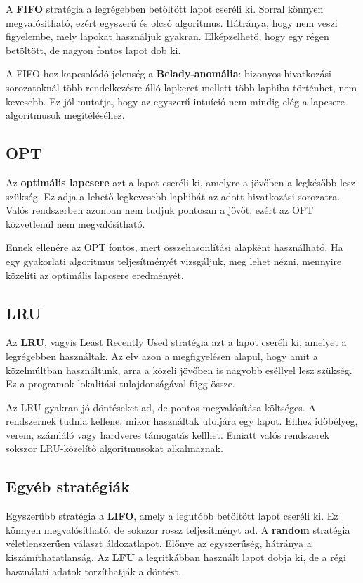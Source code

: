 A \textbf{FIFO} stratégia a legrégebben betöltött lapot cseréli ki. Sorral könnyen megvalósítható, ezért egyszerű és olcsó algoritmus. Hátránya, hogy nem veszi figyelembe, mely lapokat használjuk gyakran. Elképzelhető, hogy egy régen betöltött, de nagyon fontos lapot dob ki.

A FIFO-hoz kapcsolódó jelenség a \textbf{Belady-anomália}: bizonyos hivatkozási sorozatoknál több rendelkezésre álló lapkeret mellett több laphiba történhet, nem kevesebb. Ez jól mutatja, hogy az egyszerű intuíció nem mindig elég a lapcsere algoritmusok megítéléséhez.

\subsection{OPT}

Az \textbf{optimális lapcsere} azt a lapot cseréli ki, amelyre a jövőben a legkésőbb lesz szükség. Ez adja a lehető legkevesebb laphibát az adott hivatkozási sorozatra. Valós rendszerben azonban nem tudjuk pontosan a jövőt, ezért az OPT közvetlenül nem megvalósítható.

Ennek ellenére az OPT fontos, mert összehasonlítási alapként használható. Ha egy gyakorlati algoritmus teljesítményét vizsgáljuk, meg lehet nézni, mennyire közelíti az optimális lapcsere eredményét.

\subsection{LRU}

Az \textbf{LRU}, vagyis Least Recently Used stratégia azt a lapot cseréli ki, amelyet a legrégebben használtak. Az elv azon a megfigyelésen alapul, hogy amit a közelmúltban használtunk, arra a közeli jövőben is nagyobb eséllyel lesz szükség. Ez a programok lokalitási tulajdonságával függ össze.

Az LRU gyakran jó döntéseket ad, de pontos megvalósítása költséges. A rendszernek tudnia kellene, mikor használtak utoljára egy lapot. Ehhez időbélyeg, verem, számláló vagy hardveres támogatás kellhet. Emiatt valós rendszerek sokszor LRU-közelítő algoritmusokat alkalmaznak.

\subsection{Egyéb stratégiák}

Egyszerűbb stratégia a \textbf{LIFO}, amely a legutóbb betöltött lapot cseréli ki. Ez könnyen megvalósítható, de sokszor rossz teljesítményt ad. A \textbf{random} stratégia véletlenszerűen választ áldozatlapot. Előnye az egyszerűség, hátránya a kiszámíthatatlanság. Az \textbf{LFU} a legritkábban használt lapot dobja ki, de a régi használati adatok torzíthatják a döntést.

